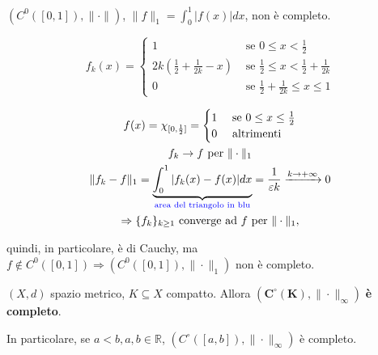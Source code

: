 \begin{exbar}
\begin{example}
	$(C^0([0,1]), \|\cdot \|)$, $\| f \|_1 = \int_{0}^{1} |f(x)|dx$, non è completo.
	
	$$f_k(x)= 
	\begin{cases}
		1 & \text{ se } 0 \leq x < \frac{1}{2} 
		\\
		2k \left(\frac{1}{2}+\frac{1}{2k}-x\right) & \text{ se } \frac{1}{2} \leq x <  \frac{1}{2} + \frac{1}{2k}
		\\
		0 & \text{ se } \frac{1}{2}+ \frac{1}{2k} \leq x \leq 1
	\end{cases}$$
	
	
	\begin{gather*} 
		f(x) = \chi_{[0, \frac{1}{2}]} = 
		\begin{cases}
			1 & \text{ se } 0 \leq x \leq \frac{1}{2}
			\\
			0 & \text{ altrimenti}
		\end{cases}
		\\
		f_k \rightarrow f \text{ per } \|\cdot\|_1
		\\
		\|f_k-f\|_1= \underbrace{\int_{0}^{1}|f_k(x)-f(x)|dx}_{\color{blue}{\text{area del triangolo in blu}}} = \frac{1}{\epsilon k} \xrightarrow{k \rightarrow +\infty} 0
		\\
		\Rightarrow \{f_k\}_{k \geq 1} \text{ converge ad $f$ per } \|\cdot \|_1,
	\end{gather*} 
	
	quindi, in particolare, è di Cauchy, ma $ f \notin C^0([0,1]) \Rightarrow (C^0([0,1]),\|\cdot\|_1)$ non è completo.
\end{example}
\end{exbar}


\begin{theorem}
	\label{th: pag 231}
	$(X,d)$ spazio metrico, $K \subseteq X$ compatto. Allora $\mathbf{(C^\circ(K), \|\cdot\|_\infty)}$ \textbf{è completo}.
	
	In particolare, se $a < b, a, b \in \mathbb{R}$, $(C^\circ([a,b]),\|\cdot\|_\infty)$ è completo.
\end{theorem}


